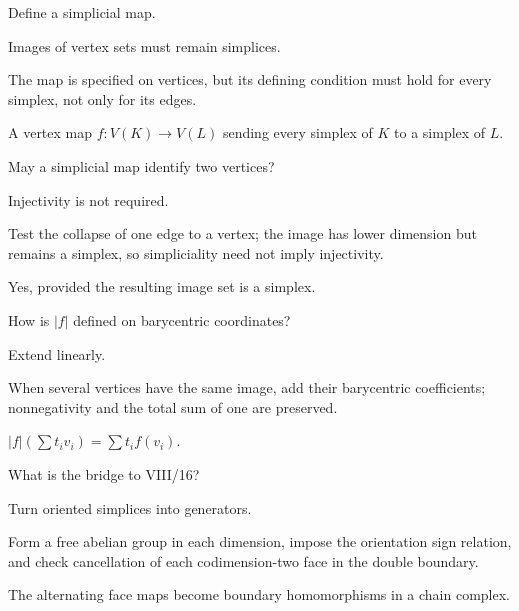 \begin{exercise}\label{exr:viii15-21}
Define a simplicial map.
\end{exercise}
\begin{hint}
Images of vertex sets must remain simplices.

The map is specified on vertices, but its defining condition must hold for every simplex, not only for its edges.
\end{hint}
\begin{solution}
A vertex map \(f:V(K)\to V(L)\) sending every simplex of \(K\) to a simplex of \(L\).
\end{solution}

\begin{exercise}\label{exr:viii15-22}
May a simplicial map identify two vertices?
\end{exercise}
\begin{hint}
Injectivity is not required.

Test the collapse of one edge to a vertex; the image has lower dimension but remains a simplex, so simpliciality need not imply injectivity.
\end{hint}
\begin{solution}
Yes, provided the resulting image set is a simplex.
\end{solution}

\begin{exercise}\label{exr:viii15-23}
How is \(|f|\) defined on barycentric coordinates?
\end{exercise}
\begin{hint}
Extend linearly.

When several vertices have the same image, add their barycentric coefficients; nonnegativity and the total sum of one are preserved.
\end{hint}
\begin{solution}
\(|f|(\sum t_iv_i)=\sum t_if(v_i)\).
\end{solution}

\begin{exercise}\label{exr:viii15-24}
What is the bridge to VIII/16?
\end{exercise}
\begin{hint}
Turn oriented simplices into generators.

Form a free abelian group in each dimension, impose the orientation sign relation, and check cancellation of each codimension-two face in the double boundary.
\end{hint}
\begin{solution}
The alternating face maps become boundary homomorphisms in a chain complex.
\end{solution}


